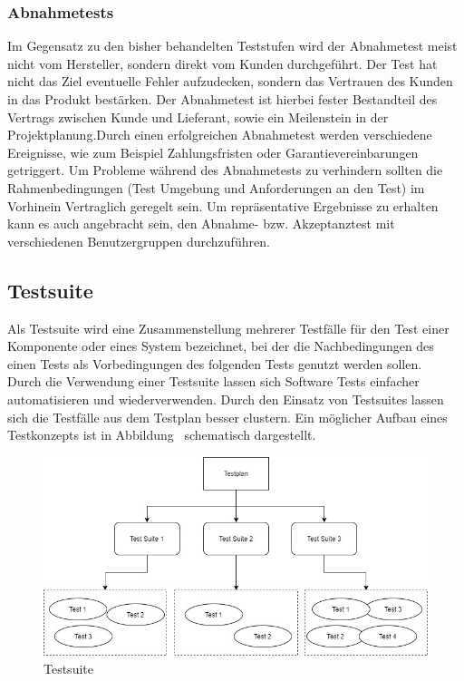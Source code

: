 \subsubsection{Abnahmetests}
Im Gegensatz zu den bisher behandelten Teststufen wird der Abnahmetest meist nicht vom Hersteller, sondern direkt vom Kunden durchgeführt. Der Test hat nicht das Ziel eventuelle Fehler aufzudecken, sondern das Vertrauen des Kunden in das Produkt bestärken. Der Abnahmetest ist hierbei fester Bestandteil des Vertrags zwischen Kunde und Lieferant, sowie ein Meilenstein in der Projektplanung.\newline Durch einen erfolgreichen Abnahmetest werden verschiedene Ereignisse, wie zum Beispiel Zahlungsfristen oder Garantievereinbarungen getriggert. Um Probleme während des Abnahmetests zu verhindern sollten die Rahmenbedingungen (Test Umgebung und Anforderungen an den Test) im Vorhinein Vertraglich geregelt sein. Um repräsentative Ergebnisse zu erhalten kann es auch angebracht sein, den Abnahme- bzw. Akzeptanztest mit verschiedenen Benutzergruppen durchzuführen.\cite{Witte.2016}
\newpage
\subsection{Testsuite}
Als Testsuite wird eine Zusammenstellung mehrerer Testf{\"a}lle f{\"u}r den Test einer Komponente oder eines System bezeichnet, bei der die Nachbedingungen des einen Tests als Vorbedingungen des folgenden Tests genutzt werden sollen.~\cite{ISTQBGlossary.2021} Durch die Verwendung einer Testsuite lassen sich Software Tests einfacher automatisieren und wiederverwenden. Durch den Einsatz von Testsuites lassen sich die Testfälle aus dem Testplan besser clustern. Ein möglicher Aufbau eines Testkonzepts ist in Abbildung \dq {}\dq~schematisch dargestellt.
\begin{figure}[h]
	\centering
  \includegraphics[width=1\textwidth]{img/Testsuite.jpg} 
   \caption{Testsuite}
  \label{fig:Testsuite.jpg}
\end{figure}
\newpage
